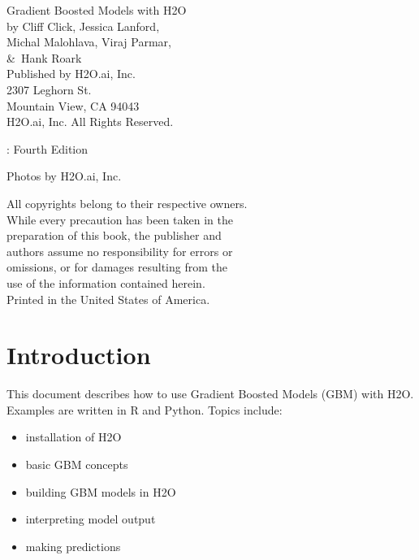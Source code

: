 {\raggedright 

Gradient Boosted Models with H2O\\

  by Cliff Click, Jessica Lanford, \\
Michal Malohlava, Viraj Parmar, \\
\&\  Hank Roark\\
\bigskip
  Published by H2O.ai, Inc. \\
2307 Leghorn St. \\
Mountain View, CA 94043\\
\bigskip
\textcopyright \the\year \hspace{1pt} H2O.ai, Inc. All Rights Reserved. 
\bigskip

\monthname \hspace{1pt}  \the\year: Fourth Edition 
\bigskip

Photos by \textcopyright H2O.ai, Inc.
\bigskip

All copyrights belong to their respective owners.\\
While every precaution has been taken in the\\
preparation of this book, the publisher and\\
authors assume no responsibility for errors or\\
omissions, or for damages resulting from the\\
use of the information contained herein.\\
\bigskip
Printed in the United States of America. 
}


\newpage
\thispagestyle{empty}%

\tableofcontents


\newpage

\section{Introduction}
This document describes how to use Gradient Boosted Models (GBM) with H2O.  
Examples are written in R and Python.
Topics include: 
\begin{itemize}
\item installation of H2O
\item basic GBM concepts
\item building GBM models in H2O
\item interpreting model output
\item making predictions
\end{itemize}



